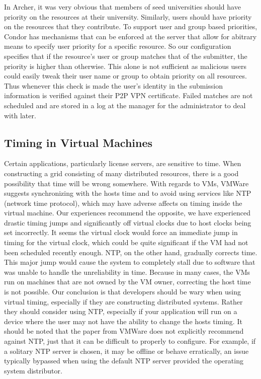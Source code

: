 \documentclass[conference]{IEEEtran}
\begin{document}
In Archer, it was very obvious that members of seed universities should have
priority on the resources at their university.  Similarly, users should have
priority on the resources that they contribute.  To support user and group
based priorities, Condor has mechanisms that can be enforced at the server that
allow for abitrary means to specify user priority for a specific resource.  So
our configuration specifies that if the resource's user or group matches that
of the submitter, the priority is higher than otherwise.  This alone is not
sufficient as malicious users could easily tweak their user name or group to
obtain priority on all resources.  Thus whenever this check is made the user's
identity in the submission information is verified against their P2P VPN
certificate.  Failed matches are not scheduled and are stored in a log at the
manager for the administrator to deal with later.

\subsection{Timing in Virtual Machines}

Certain applications, particularly license servers, are sensitive to time.
When constructing a grid consisting of many distributed resources, there is a
good possibility that time will be wrong somewhere.  With regards to VMs,
VMWare~\cite{vmware_timing} suggests synchronizing with the hosts time and to
avoid using services like NTP (network time protocol), which may have adverse
affects on timing inside the virtual machine.  Our experiences recommend the
opposite, we have experienced drastic timing jumps and significantly off
virtual clocks due to host clocks being set incorrectly.  It seems the virtual
clock would force an immediate jump in timing for the virtual clock, which
could be quite significant if the VM had not been scheduled recently enough.
NTP, on the other hand, gradually corrects time.  This major jump would cause
the system to completely stall due to software that was unable to handle the
unreliability in time.  Because in many cases, the VMs run on machines that are
not owned by the VM owner, correcting the host time is not possible.  Our
conclusion is that developers should be wary when using virtual timing,
especially if they are constructing distributed systems.  Rather they should
consider using NTP, especially if your application will run on a device where
the user may not have the ability to change the hosts timing.  It should be
noted that the paper from VMWare does not explicitly recommend against NTP,
just that it can be difficult to properly to configure.  For example, if a
solitary NTP server is chosen, it may be offline or behave erratically, an
issue typically bypassed when using the default NTP server provided the
operating system distributor.
\end{document}
